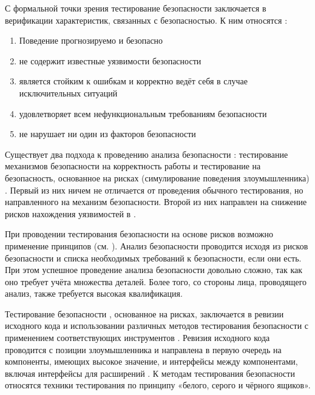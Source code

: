 %
С формальной точки зрения тестирование безопасности  заключается в верификации характеристик, связанных с безопасностью. 
%
К ним относятся :
\begin{enumerate}
	\setlength{\itemsep}{0pt}%

	\item Поведение  прогнозируемо и безопасно
	
	\item {} не содержит известные уязвимости безопасности
	
	\item {} является стойким к ошибкам и корректно ведёт себя в случае исключительных ситуаций

	\item {} удовлетворяет всем нефункциональным требованиям безопасности

	\item {} не нарушает ни один из факторов безопасности
\end{enumerate}

%
Существует два подхода к проведению анализа безопасности : тестирование механизмов безопасности на корректность работы и тестирование  на безопасность, основанное на рисках (симулирование поведения злоумышленника) . 
%
Первый из них ничем не отличается от проведения обычного тестирования, но направленного на механизм безопасности. 
%
Второй из них направлен на снижение рисков нахождения уязвимостей в .

%
При проводении тестирования безопасности  на основе рисков возможно применение принципов \CIATriad (см. ). 
%
Анализ безопасности проводится исходя из рисков безопасности и списка необходимых требований к безопасности, если они есть. 
%
При этом успешное проведение анализа безопасности довольно сложно, так как оно требует учёта множества деталей. 
%
Более того, со стороны лица, проводящего анализ, также требуется высокая квалификация.

%
Тестирование безопасности , основанное на рисках, заключается в ревизии исходного кода и использовании различных методов тестирования безопасности с применением соответствующих инструментов . 
%
Ревизия исходного кода проводится с позиции злоумышленника и направлена в первую очередь на компоненты, имеющих высокое значение, и интерфейсы между компонентами, включая интерфейсы для расширений . 
%
К методам тестирования безопасности относятся техники тестирования по принципу «белого, серого и чёрного ящиков».

